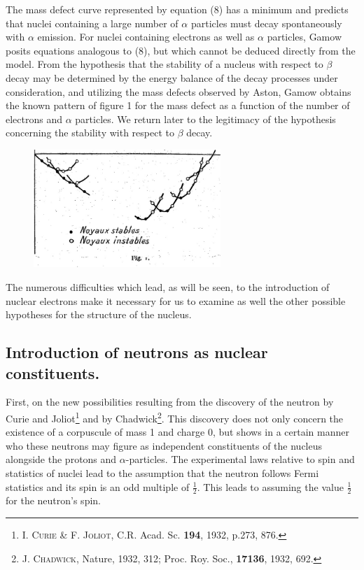 \documentclass[a4paper,11pt]{article}
\newcommand{\?}[2]{#1\footnote{\textsc{Translator note}: #2}}
\newcommand{\citeauthor}[1]{\textsc{#1}}
\newcommand{\citepub}[1]{#1}
\newcommand{\citevol}[1]{\textbf{#1}}
\newcommand{\citepage}[1]{#1}
\newcommand{\citeyear}[1]{#1}
\begin{document}
The mass defect curve represented by equation (8) has a minimum and predicts that nuclei containing a large number of $\alpha$ particles must decay spontaneously with $\alpha$ emission. For nuclei containing electrons as well as $\alpha$ particles, Gamow posits equations analogous to (8), but which cannot be deduced directly from the model. From the hypothesis that the stability of a nucleus with respect to $\beta$ decay may be determined by the energy balance of the decay processes under consideration, and utilizing the mass defects observed by Aston, Gamow obtains the known pattern of figure 1 for the mass defect as a function of the number of electrons and $\alpha$ particles. We return later to the legitimacy of the hypothesis concerning the stability with respect to $\beta$ decay.

\begin{figure}[h!]
\centering
\includegraphics[width=200pt]{images/figure1}
\end{figure}

The numerous difficulties which lead, as will be seen, to the introduction of nuclear electrons make it necessary for us to examine as well the other possible hypotheses for the structure of the nucleus.

\subsection{Introduction of neutrons as nuclear constituents.}

First, on the new possibilities resulting from the discovery of the neutron by Curie and Joliot\footnote{\citeauthor{I. Curie \& F. Joliot}, \citepub{C.R. Acad. Sc.} \citevol{194}, \citeyear{1932}, \citepage{p.273, 876.}} and by Chadwick\footnote{\citeauthor{J. Chadwick}, \citepub{Nature}, \citeyear{1932}, \citepage{312}; \citepub{Proc. Roy. Soc.}, \citevol{17136}, \citeyear{1932}, \citepage{692}.}. This discovery does not only concern the existence of a corpuscule of mass 1 and charge 0, but shows in a certain manner who these neutrons may figure as independent constituents of the nucleus alongside the protons  and $\alpha$-particles. The experimental laws relative to spin and statistics of nuclei lead to the assumption that the neutron follows Fermi statistics and its spin is an odd multiple of $\frac{1}{2}$. This leads to assuming the value $\frac{1}{2}$ for the neutron's spin.
\end{document}
